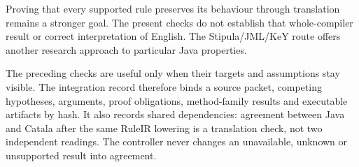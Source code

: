 \documentclass[12pt,a4paper,oneside,openany]{book}
\begin{document}
\begin{MapDiagram}
\end{MapDiagram}

Proving that every supported rule preserves its behaviour through translation
remains a stronger goal. The present checks do not establish that whole-compiler
result or correct interpretation of English. The Stipula/JML/KeY route offers
another research approach to particular Java properties.

\clearpage
{}
The preceding checks are useful only when their targets and assumptions stay
visible. The integration record therefore binds a source packet, competing
hypotheses, arguments, proof obligations, method-family results and executable
artifacts by hash. It also records shared dependencies: agreement between Java
and Catala after the same RuleIR lowering is a translation check, not two
independent readings. The controller never changes an unavailable, unknown or
unsupported result into agreement.
\end{document}
